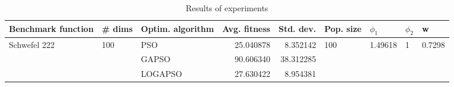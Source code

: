 \begin{table}
\centering
\caption{Results of experiments}
\begin{tabular}{lllrrllll}
\toprule
           Benchmark function &              \# dims & Optim. algorithm &  Avg. fitness &  Std. dev. &            Pop. size &               $\phi_{1}$ &         $\phi_{2}$ &                       w \\
\midrule
\multirow{3}{*}{Schwefel 222} & \multirow{3}{*}{100} &              PSO &     25.040878 &   8.352142 & \multirow{3}{*}{100} & \multirow{3}{*}{1.49618} & \multirow{3}{*}{1} & \multirow{3}{*}{0.7298} \\
                              &                      &            GAPSO &     90.606340 &  38.312285 &                      &                          &                    &                         \\
                              &                      &          LOGAPSO &     27.630422 &   8.954381 &                      &                          &                    &                         \\
\bottomrule
\end{tabular}
\end{table}

